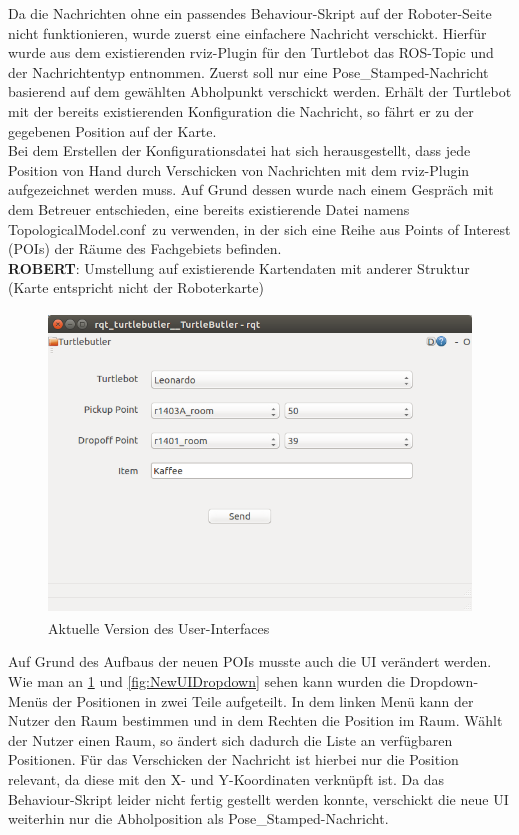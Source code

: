 \documentclass[a4paper,12pt,headsepline]{scrartcl}
\begin{document}
				Da die Nachrichten ohne ein passendes Behaviour-Skript auf der Roboter-Seite nicht funktionieren, wurde zuerst eine einfachere Nachricht verschickt. Hierfür wurde aus dem existierenden rviz-Plugin für den Turtlebot das ROS-Topic und der Nachrichtentyp entnommen. Zuerst soll nur eine \glqq Pose{\_}Stamped\grqq-Nachricht basierend auf dem gewählten Abholpunkt verschickt werden. Erhält der Turtlebot mit der bereits existierenden Konfiguration die Nachricht, so fährt er zu der gegebenen Position auf der Karte.\\
				Bei dem Erstellen der Konfigurationsdatei hat sich herausgestellt, dass jede Position von Hand durch Verschicken von Nachrichten mit dem rviz-Plugin aufgezeichnet werden muss. Auf Grund dessen wurde nach einem Gespräch mit dem Betreuer entschieden, eine bereits existierende Datei namens \glqq TopologicalModel.conf\grqq\ zu verwenden, in der sich eine Reihe aus Points of Interest (POIs) der Räume des Fachgebiets befinden.\\
				\textbf{ROBERT}: Umstellung auf existierende Kartendaten mit anderer Struktur (Karte entspricht nicht der Roboterkarte)\\
				\begin{figure} [H]
					\centering
					\includegraphics[height=8cm]{Images/Turtlebutler_Used.png}
					\caption{Aktuelle Version des User-Interfaces}
					\label{fig:NewUI}
				\end{figure}
				Auf Grund des Aufbaus der neuen POIs musste auch die UI verändert werden. Wie man an \cref{fig:NewUI} und \cref{fig:NewUIDropdown} sehen kann wurden die Dropdown-Menüs der Positionen in zwei Teile aufgeteilt. In dem linken Menü kann der Nutzer den Raum bestimmen und in dem Rechten die Position im Raum. Wählt der Nutzer einen Raum, so ändert sich dadurch die Liste an verfügbaren Positionen. Für das Verschicken der Nachricht ist hierbei nur die Position relevant, da diese mit den X- und Y-Koordinaten verknüpft ist. Da das Behaviour-Skript leider nicht fertig gestellt werden konnte, verschickt die neue UI weiterhin nur die Abholposition als \glqq Pose{\_}Stamped\grqq-Nachricht.
\end{document}
